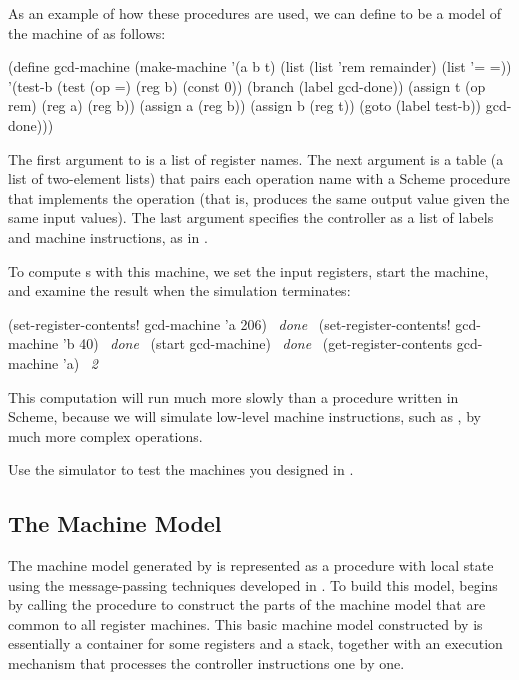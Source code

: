\noindent
As an example of how these procedures are used, we can define
 to be a model of the  machine of
 as follows:

\begin{codeBlock}
(define gcd-machine
  (make-machine
   '(a b t)
   (list (list 'rem remainder) (list '= =))
   '(test-b (test (op =) (reg b) (const 0))
            (branch (label gcd-done))
            (assign t (op rem) (reg a) (reg b))
            (assign a (reg b))
            (assign b (reg t))
            (goto (label test-b))
            gcd-done)))
\end{codeBlock}

\noindent
The first argument to  is a list of register names.  The
next argument is a table (a list of two-element lists) that pairs each
operation name with a Scheme procedure that implements the operation (that is,
produces the same output value given the same input values).  The last argument
specifies the controller as a list of labels and machine instructions, as in
.

To compute s with this machine, we set the input registers, start
the machine, and examine the result when the simulation terminates:

\begin{codeBlock}
(set-register-contents! gcd-machine 'a 206)
~\textit{done}~
(set-register-contents! gcd-machine 'b 40)
~\textit{done}~
(start gcd-machine)
~\textit{done}~
(get-register-contents gcd-machine 'a)
~\textit{2}~
\end{codeBlock}

\noindent
This computation will run much more slowly than a  procedure written
in Scheme, because we will simulate low-level machine instructions, such as
, by much more complex operations.

\begin{exerciseGroup}
\label{Exercise 5.7}
 Use the simulator to test the
machines you designed in .
\end{exerciseGroup}



\subsection{The Machine Model}
\label{Section 5.2.1}

The machine model generated by  is represented as a
procedure with local state using the message-passing techniques developed in
.  To build this model,  begins by calling
the procedure  to construct the parts of the machine
model that are common to all register machines.  This basic machine model
constructed by  is essentially a container for some
registers and a stack, together with an execution mechanism that processes the
controller instructions one by one.

